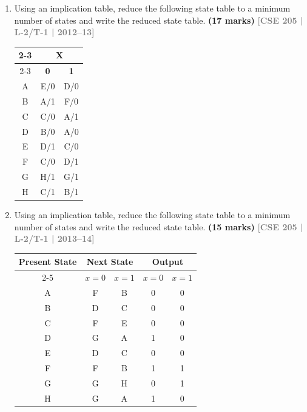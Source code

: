\documentclass[12pt,a4paper]{article}
\newcommand{\yr}[1]{\hfill\textcolor{gray}{\small\textbf{[#1]}}}
\newcommand{\mk}[1]{\textcolor{orange!70!black}{\small\textbf{(#1 marks)}}}
\begin{document}
\label{sub:s6-state-min}

\begin{enumerate}

\item Using an implication table, reduce the following state table to a minimum number of states and write the reduced state table.
\mk{17} \yr{CSE 205 | L-2/T-1 | 2012--13}

\begin{center}
  \begin{tabular}{|c|c|c|}
        \cline{2-3}
        \multicolumn{1}{c|}{} & \multicolumn{2}{c|}{\textbf{X}} \\
        \cline{2-3}
        \multicolumn{1}{c|}{} & \textbf{0} & \textbf{1} \\
        \hline
        A & E/0 & D/0 \\
        \hline
        B & A/1 & F/0 \\
        \hline
        C & C/0 & A/1 \\
        \hline
        D & B/0 & A/0 \\
        \hline
        E & D/1 & C/0 \\
        \hline
        F & C/0 & D/1 \\
        \hline
        G & H/1 & G/1 \\
        \hline
        H & C/1 & B/1 \\
        \hline
    \end{tabular}
\end{center}

\item Using an implication table, reduce the following state table to a minimum number of states and write the reduced state table.
\mk{15} \yr{CSE 205 | L-2/T-1 | 2013--14}

\begin{center}
  \begin{tabular}{|c|c|c|c|c|}
        \hline
        \multirow{2}{*}{Present State} & \multicolumn{2}{c|}{Next State} & \multicolumn{2}{c|}{Output} \\
        \cline{2-5}
         & $x = 0$ & $x = 1$ & $x = 0$ & $x = 1$ \\
        \hline
        A & F & B & 0 & 0 \\
        \hline
        B & D & C & 0 & 0 \\
        \hline
        C & F & E & 0 & 0 \\
        \hline
        D & G & A & 1 & 0 \\
        \hline
        E & D & C & 0 & 0 \\
        \hline
        F & F & B & 1 & 1 \\
        \hline
        G & G & H & 0 & 1 \\
        \hline
        H & G & A & 1 & 0 \\
        \hline
    \end{tabular}
\end{center}



\end{enumerate}
\end{document}
